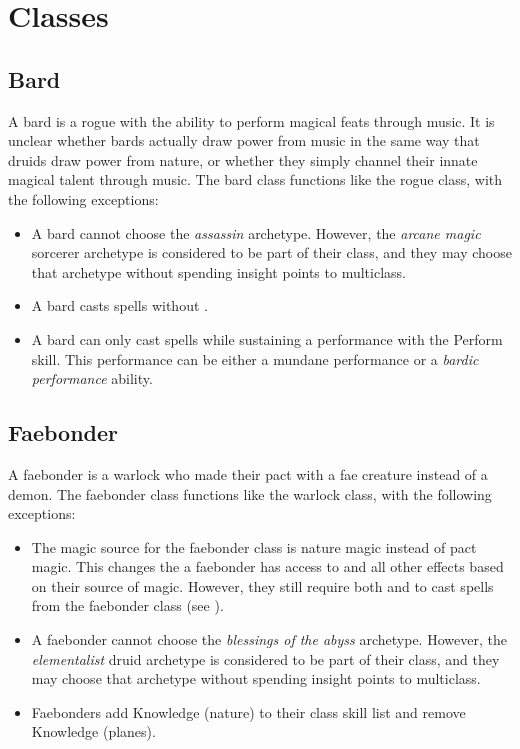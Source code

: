 \section{Classes}
    \subsection{Bard}
        A bard is a rogue with the ability to perform magical feats through music.
        It is unclear whether bards actually draw power from music in the same way that druids draw power from nature, or whether they simply channel their innate magical talent through music.
        The bard class functions like the rogue class, with the following exceptions:
        \begin{itemize}
            \item A bard cannot choose the \textit{assassin} archetype. However, the \textit{arcane magic} sorcerer archetype is considered to be part of their class, and they may choose that archetype without spending insight points to multiclass.
            \item A bard casts spells without .
            \item A bard can only cast spells while sustaining a performance with the Perform skill. This performance can be either a mundane performance or a \textit{bardic performance} ability.
        \end{itemize}

    \subsection{Faebonder}
        A faebonder is a warlock who made their pact with a fae creature instead of a demon.
        The faebonder class functions like the warlock class, with the following exceptions:
        \begin{itemize}
            \item The magic source for the faebonder class is nature magic instead of pact magic.
                This changes the  a faebonder has access to and all other effects based on their source of magic.
                However, they still require both  and  to cast spells from the faebonder class (see ).
            \item A faebonder cannot choose the \textit{blessings of the abyss} archetype. However, the \textit{elementalist} druid archetype is considered to be part of their class, and they may choose that archetype without spending insight points to multiclass.
            \item Faebonders add Knowledge (nature) to their class skill list and remove Knowledge (planes).
        \end{itemize}

